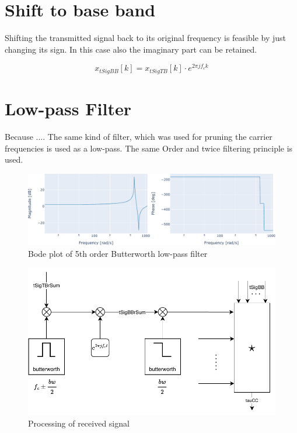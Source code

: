 \section{Shift to base band}

Shifting the transmitted signal back to its original frequency is feasible by just changing its sign. In this case also the imaginary part can be retained.

\begin{equation}
	x_{tSigBB}[k]=x_{tSigTB}[k]\cdot e^{2\pi j f_c k}
	\label{eq:rshift}
\end{equation}

\section{Low-pass Filter}
Because .... The same kind of filter, which was used for pruning the carrier frequencies is used as a low-pass. The same Order and twice filtering principle is used.
\begin{figure}[h]
	\includegraphics[width=\linewidth]{images/bode}
	
	\caption{Bode plot of 5th order Butterworth low-pass filter}
	\label{fig:bode}
\end{figure}

\begin{figure}[h]
	\includegraphics[width=\linewidth]{images/recsig}
	
	\caption{Processing of received signal}
	\label{fig:recsig}
\end{figure}


